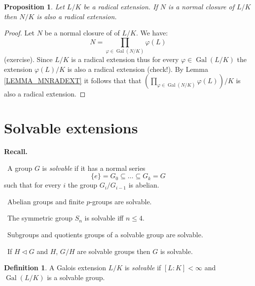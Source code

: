 \documentclass[12pt, letterpaper, oneside]{article}
\theoremstyle{plain}
\newtheorem{proposition}[theorem]{Proposition}
\theoremstyle{definition}
\newtheorem{definition}[theorem]{Definition}
\newcommand{\Gal}{\operatorname{Gal}}
\newcommand{\vs}{\vskip 5mm}
\begin{document}
\vs\vs

\begin{proposition}
\label{PROP_NORMCLRADEXT}
Let $L/K$ be a radical extension. If $N$ is a normal closure of $L/K$ then $N/K$
is also a radical extension. 
\end{proposition}


\vs

\begin{proof}
Let $N$ be a normal closure of of $L/K$. We have:
$$N = \prod_{\varphi\in \Gal(N/K)} \varphi(L)$$
(exercise). Since $L/K$ is a radical extension thus for every $\varphi\in \Gal(L/K)$ 
the extension $\varphi(L)/K$ is also a radical extension (check!). 
By Lemma \ref{LEMMA_MNRADEXT} it follows that 
that  $\left(\prod_{\varphi\in \Gal(N/K)} \varphi(L)\right)/K$ is also a radical extension. 
\end{proof}






\newpage
\section{Solvable extensions}
\label{SEC_SOLVEXT}




\textbf{Recall. } 

\textbf{\textbullet} \ A group $G$ is \emph{solvable} if it has a normal series
$$\{e\}= G_{0} \subseteq {\dots} \subseteq G_{k} = G$$
such that for every $i$ the group $G_{i}/G_{i-1}$ is abelian.


\textbf{\textbullet} \ Abelian groups and finite $p$-groups are solvable. 


\textbf{\textbullet} \ The symmetric group $S_{n}$ is solvable iff $n\leq 4$. 

\textbf{\textbullet} \ Subgroups and quotients groups of a solvable group are solvable. 


\textbf{\textbullet} \ If $H\lhd G$ and $H$, $G/H$ are solvable groups then  $G$ is solvable.  


\vs\vs


\begin{definition}
A Galois extension $L/K$ is \emph{solvable} if $[L:K]<\infty$ and $\Gal(L/K)$ is a 
solvable group. 
\end{definition}

\vs\vs
\end{document}
